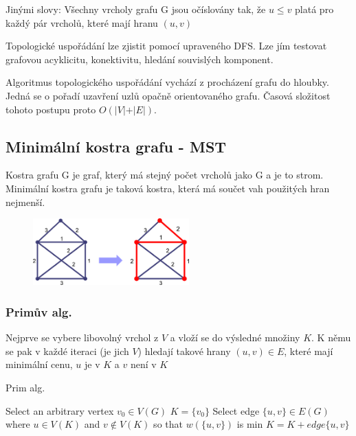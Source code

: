 Jinými slovy: Všechny vrcholy grafu G jsou očíslovány tak, že $u\leq v$ platá pro každý pár vrcholů, které mají hranu $(u,v)$

Topologické uspořádání lze zjistit pomocí upraveného DFS. Lze jím testovat grafovou acyklicitu, konektivitu, hledání souvislých komponent.

Algoritmus topologického uspořádání vychází z procházení grafu do hloubky. Jedná se o pořadí uzavření uzlů opačně orientovaného grafu. Časová složitost tohoto postupu proto $O(\vert V \vert + \vert E \vert)$.

\subsection{Minimální kostra grafu - MST}
Kostra grafu G je graf, který má stejný počet vrcholů jako G a je to strom. Minimální kostra grafu je taková kostra, která má součet vah použitých hran nejmenší.

\begin{figure}[h]
    \begin{center}
        \includegraphics[width=60mm]{spolecne/02/images/spanning-tree}
    \end{center}
\end{figure}

\vspace{-10px}

\subsubsection{Primův alg.}
Nejprve se vybere libovolný vrchol z $V$ a vloží se do výsledné množiny $K$. K němu se pak v každé iteraci (je jich $V$) hledají takové hrany $(u,v) \in E$, které mají minimální cenu, $u$ je v $K$ a $v$ není v $K$

\begin{algorithm}
\caption{Prim alg.}
\begin{algorithmic}
\State Select an arbitrary vertex $v_0 \in V(G)$
\State $K = \{v_0\}$
  \State Select edge $\{u,v\} \in E(G)$ where $u \in V(K)$ and $v \notin V(K)$ so that $w(\{u,v\})$ is min
  \State $K = K + edge\{u,v\}$
\EndWhile
\end{algorithmic}
\end{algorithm}

